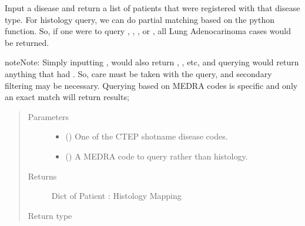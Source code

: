 \documentclass[letterpaper,10pt,english]{sphinxmanual}
\begin{document}
\begin{fulllineitems}
\begin{fulllineitems}
\label{\detokenize{matchbox_api_utils:matchbox_api_utils.match_data.MatchData.get_patients_by_disease}}
Input a disease and return a list of patients that were registered with
that disease type. For histology query, we can do partial matching based
on the python  function. So, if one were to query ,  , , or , all Lung Adenocarinoma
cases would be returned.

\begin{sphinxadmonition}{note}{Note:}
Simply inputting , would also return , , etc, and querying
 would return anything that had . So, care must be taken
with the query, and secondary filtering may be necessary. Querying
based on MEDRA codes is specific and only an exact match will return
results; 
\end{sphinxadmonition}
\begin{quote}\begin{description}
\item[{Parameters}] \leavevmode\begin{itemize}
\item {} 
 () \textendash{} One of the CTEP shotname disease codes.

\item {} 
 () \textendash{} A MEDRA code to query rather than histology.

\end{itemize}

\item[{Returns}] \leavevmode
Dict of Patient : Histology Mapping

\item[{Return type}] \leavevmode
{}


\end{description}
\end{quote}
\end{fulllineitems}
\end{fulllineitems}
\end{document}
